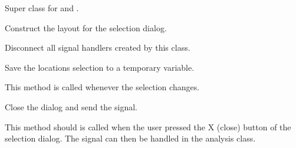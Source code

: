 \documentclass[letterpaper,10pt,english]{sphinxmanual}
\begin{document}
\begin{fulllineitems}
\label{setlyze/gui:setlyze.gui.SelectionWindow}
Super class for {\hyperref[setlyze/gui:setlyze.gui.SelectLocations]{}} and {\hyperref[setlyze/gui:setlyze.gui.SelectSpecies]{}}.

\begin{fulllineitems}
\label{setlyze/gui:setlyze.gui.SelectionWindow.create_layout}
Construct the layout for the selection dialog.

\end{fulllineitems}


\begin{fulllineitems}
\label{setlyze/gui:setlyze.gui.SelectionWindow.destroy_handler_connections}
Disconnect all signal handlers created by this class.

\end{fulllineitems}


\begin{fulllineitems}
\label{setlyze/gui:setlyze.gui.SelectionWindow.on_changed}
Save the locations selection to a temporary variable.

This method is called whenever the selection changes.

\end{fulllineitems}


\begin{fulllineitems}
\label{setlyze/gui:setlyze.gui.SelectionWindow.on_close_dialog}
Close the dialog and send the 
signal.

This method should is called when the user pressed the X (close)
button of the selection dialog. The signal can then be handled
in the analysis class.


\end{fulllineitems}
\end{fulllineitems}
\end{document}
